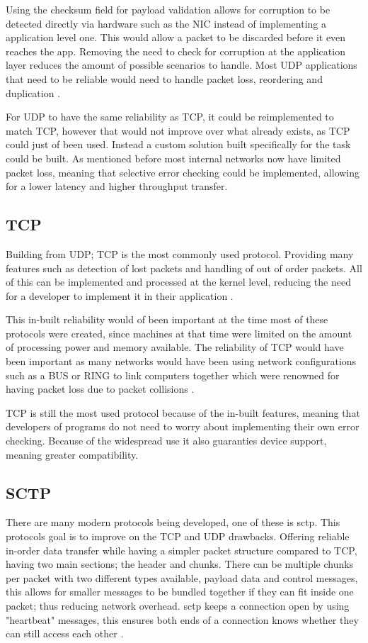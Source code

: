Using the checksum field for payload validation allows for corruption to be detected directly via hardware such as the NIC instead of implementing a application level one. This would allow a packet to be discarded before it even reaches the app. Removing the need to check for corruption at the application layer reduces the amount of possible scenarios to handle. Most UDP applications that need to be reliable would need to handle packet loss, reordering and duplication \parencite{steinke2001tcp}.

For UDP to have the same reliability as TCP, it could be reimplemented to match TCP, however that would not improve over what already exists, as TCP could just of been used. Instead a custom solution built specifically for the task could be built. As mentioned before most internal networks now have limited packet loss, meaning that selective error checking could be implemented, allowing for a lower latency and higher throughput transfer.

\subsection*{TCP}
Building from UDP; TCP is the most commonly used protocol. Providing many features such as detection of lost packets and handling of out of order packets. All of this can be implemented and processed at the kernel level, reducing the need for a developer to implement it in their application \parencite{tcp-rfc793}.

This in-built reliability would of been important at the time most of these protocols were created, since machines at that time were limited on the amount of processing power and memory available. The reliability of TCP would have been important as many networks would have been using network configurations such as a BUS or RING to link computers together which were renowned for having packet loss due to packet collisions \parencite{steinke2001tcp}.

TCP is still the most used protocol because of the in-built features, meaning that developers of programs do not need to worry about implementing their own error checking. Because of the widespread use it also guaranties device support, meaning greater compatibility.

\subsection*{SCTP}
There are many modern protocols being developed, one of these is \acrfull{sctp}. This protocols goal is to improve on the TCP and UDP drawbacks. Offering reliable in-order data transfer while having a simpler packet structure compared to TCP, having two main sections; the header and chunks. There can be multiple chunks per packet with two different types available, payload data and control messages, this allows for smaller messages to be bundled together if they can fit inside one packet; thus reducing network overhead. \acrshort{sctp} keeps a connection open by using "heartbeat" messages, this ensures both ends of a connection knows whether they can still access each other \parencite{sctp-rfc9260} \parencite{ladha2004improving}.

